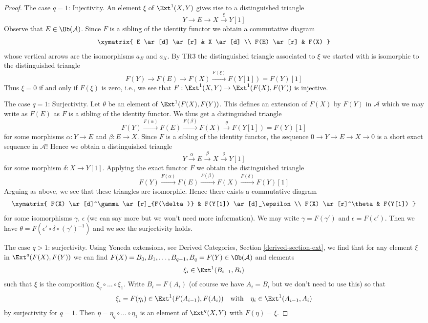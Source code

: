 \begin{proof}
\medskip\noindent
The case $q = 1$: Injectivity. An element $\xi$ of $\Ext^1(X, Y)$
gives rise to a distinguished triangle
$$
Y \to E \to X \xrightarrow{\xi} Y[1]
$$
Observe that $E \in \Ob(\mathcal{A})$. Since $F$ is a sibling of the
identity functor we obtain a commutative diagram
$$
\xymatrix{
E \ar[d] \ar[r] & X \ar[d] \\
F(E) \ar[r] & F(X)
}
$$
whose vertical arrows are the isomorphisms $a_E$ and $a_X$.
By TR3 the distinguished triangle associated to $\xi$ we started
with is isomorphic to the distinguished triangle
$$
F(Y) \to F(E) \to F(X) \xrightarrow{F(\xi)} F(Y[1]) = F(Y)[1]
$$
Thus $\xi = 0$ if and only if $F(\xi)$ is zero, i.e., we see that
$F : \Ext^1(X, Y) \to \Ext^1(F(X), F(Y))$ is injective.

\medskip\noindent
The case $q = 1$: Surjectivity. Let $\theta$ be an element of
$\Ext^1(F(X), F(Y))$. This defines an extension of $F(X)$ by $F(Y)$
in $\mathcal{A}$ which we may write as $F(E)$
as $F$ is a sibling of the identity functor. We thus get a distinguished
triangle
$$
F(Y) \xrightarrow{F(\alpha)} F(E)
\xrightarrow{F(\beta)} F(X)
\xrightarrow{\theta} F(Y[1]) = F(Y)[1]
$$
for some morphisms $\alpha : Y \to E$ and $\beta : E \to X$.
Since $F$ is a sibling of the identity functor, the sequence
$0 \to Y \to E \to X \to 0$
is a short exact sequence in $\mathcal{A}$! Hence we obtain a
distinguished triangle
$$
Y \xrightarrow{\alpha} E \xrightarrow{\beta} X \xrightarrow{\delta} Y[1]
$$
for some morphism $\delta : X \to Y[1]$. Applying the exact functor
$F$ we obtain the distinguished triangle
$$
F(Y) \xrightarrow{F(\alpha)} F(E) \xrightarrow{F(\beta)} F(X)
\xrightarrow{F(\delta)} F(Y)[1]
$$
Arguing as above, we see that these triangles are isomorphic.
Hence there exists a commutative diagram
$$
\xymatrix{
F(X) \ar[d]^\gamma \ar[r]_{F(\delta)} & F(Y[1]) \ar[d]_\epsilon \\
F(X) \ar[r]^\theta & F(Y[1])
}
$$
for some isomorphisms $\gamma$, $\epsilon$ (we can say more but we won't
need more information). We may write $\gamma = F(\gamma')$ and
$\epsilon = F(\epsilon')$. Then we have
$\theta = F(\epsilon' \circ \delta \circ (\gamma')^{-1})$
and we see the surjectivity holds.

\medskip\noindent
The case $q > 1$: surjectivity. Using Yoneda extensions, see
Derived Categories, Section \ref{derived-section-ext}, we find that for any
element $\xi$ in $\Ext^q(F(X), F(Y))$ we can find
$F(X) = B_0, B_1, \ldots, B_{q - 1}, B_q = F(Y) \in \Ob(\mathcal{A})$ and
elements
$$
\xi_i \in \Ext^1(B_{i - 1}, B_i)
$$
such that $\xi$ is the composition $\xi_q \circ \ldots \circ \xi_1$.
Write $B_i = F(A_i)$ (of course we have $A_i = B_i$ but we don't
need to use this) so that
$$
\xi_i = F(\eta_i) \in \Ext^1(F(A_{i - 1}), F(A_i))
\quad\text{with}\quad
\eta_i \in \Ext^1(A_{i - 1}, A_i)
$$
by surjectivity for $q = 1$. Then $\eta = \eta_q \circ \ldots \circ \eta_1$
is an element of $\Ext^q(X, Y)$ with $F(\eta) = \xi$.


\end{proof}
